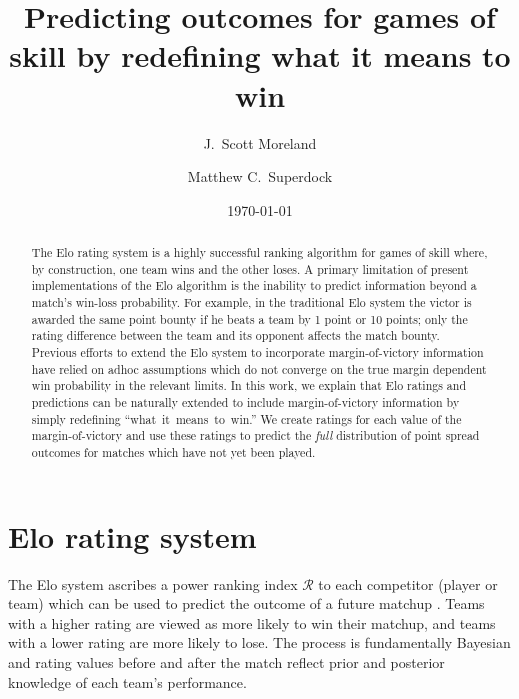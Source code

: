\documentclass[aps,prc,reprint,amsmath,superscriptaddress,nofootinbib]{revtex4-1}
\newcommand{\R}{\mathcal{R}}
\begin{document}
\title{Predicting outcomes for games of skill by redefining what it means to win}

\author{J.\ Scott Moreland}
\author{Matthew C.\ Superdock}

\date{\today}


\begin{abstract}
The Elo rating system is a highly successful ranking algorithm for games of skill where, by construction, one team wins and the other loses.
A primary limitation of present implementations of the Elo algorithm is the inability to predict information beyond a match's win-loss probability.
For example, in the traditional Elo system the victor is awarded the same point bounty if he beats a team by 1 point or 10 points; only the rating difference between the team and its opponent affects the match bounty.
Previous efforts to extend the Elo system to incorporate margin-of-victory information have relied on adhoc assumptions which do not converge on the true margin dependent win probability in the relevant limits.
  In this work, we explain that Elo ratings and predictions can be naturally extended to include margin-of-victory information by simply redefining \mbox{``what it means to win.''}
We create ratings for each value of the margin-of-victory and use these ratings to predict the \emph{full} distribution of point spread outcomes for matches which have not yet been played.
\end{abstract}


\maketitle

\section{Elo rating system}

The Elo system ascribes a power ranking index $\R$ to each competitor (player or team) which can be used to predict the outcome of a future matchup \cite{elo1978rating}.
Teams with a higher rating are viewed as more likely to win their matchup, and teams with a lower rating are more likely to lose.
The process is fundamentally Bayesian and rating values before and after the match reflect prior and posterior knowledge of each team's performance.
\end{document}
